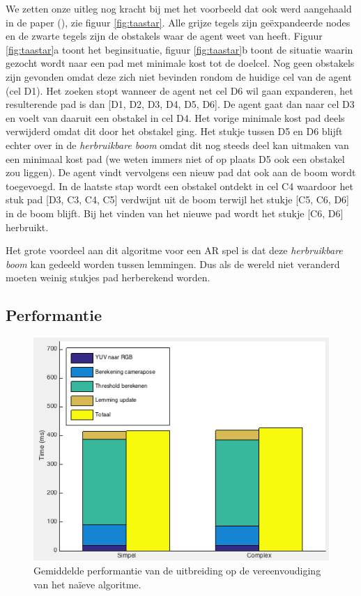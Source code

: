 We zetten onze uitleg nog kracht bij met het voorbeeld dat ook werd aangehaald in de paper (\cite{hernandez2011tree}), zie figuur \ref{fig:taastar}. Alle grijze tegels zijn ge\"expandeerde nodes en de zwarte tegels zijn de obstakels waar de agent weet van heeft. Figuur \ref{fig:taastar}a toont het beginsituatie, figuur \ref{fig:taastar}b toont de situatie waarin gezocht wordt naar een pad met minimale kost tot de doelcel. Nog geen obstakels zijn gevonden omdat deze zich niet bevinden rondom de huidige cel van de agent (cel D1). Het zoeken stopt wanneer de agent net cel D6 wil gaan expanderen, het resulterende pad is dan [D1, D2, D3, D4, D5, D6]. De agent gaat dan naar cel D3 en voelt van daaruit een obstakel in cel D4. Het vorige minimale kost pad deels verwijderd omdat dit door het obstakel ging. Het stukje tussen D5 en D6 blijft echter over in de \textit{herbruikbare boom} omdat dit nog steeds deel kan uitmaken van een minimaal kost pad (we weten immers niet of op plaats D5 ook een obstakel zou liggen). De agent vindt vervolgens een nieuw pad dat ook aan de boom wordt toegevoegd. In de laatste stap wordt een obstakel ontdekt in cel C4 waardoor het stuk pad [D3, C3, C4, C5] verdwijnt uit de boom terwijl het stukje [C5, C6, D6] in de boom blijft. Bij het vinden van het nieuwe pad wordt het stukje [C6, D6] herbruikt.

Het grote voordeel aan dit algoritme voor een AR spel is dat deze \textit{herbruikbare boom} kan gedeeld worden tussen lemmingen. Dus als de wereld niet veranderd moeten weinig stukjes pad herberekend worden.

\subsection{Performantie}

\begin{figure}
  \centering
  \includegraphics[width=.75\linewidth]{img/naiveTAAPerf}
  \caption{Gemiddelde performantie van de uitbreiding op de vereenvoudiging van het na\"ieve algoritme.}
  \label{fig:naive_uitbr_perf}
\end{figure}

